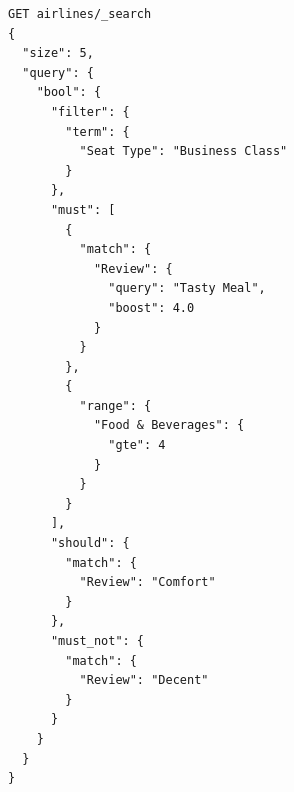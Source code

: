 \documentclass{Configuration_Files/PoliMi3i_thesis}
\begin{document}
\begin{enumerate}
\begin{verbatim}
GET airlines/_search
{
  "size": 5, 
  "query": {
    "bool": {
      "filter": {
        "term": {
          "Seat Type": "Business Class"
        }
      },
      "must": [
        {
          "match": {
            "Review": {
              "query": "Tasty Meal",
              "boost": 4.0
            }
          }
        },
        {
          "range": {
            "Food & Beverages": {
              "gte": 4
            }
          }
        }
      ],
      "should": {
        "match": {
          "Review": "Comfort"
        }
      }, 
      "must_not": {
        "match": {
          "Review": "Decent"
        }
      }
    }
  }
}
\end{verbatim}

\newpage
\begin{figure}[H]
    \centering
    \subfloat{
}
\end{figure}
\end{enumerate}
\end{document}
